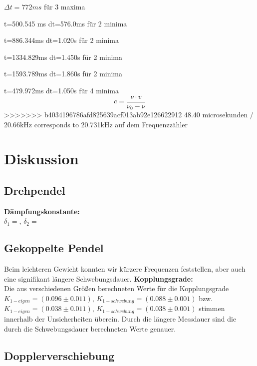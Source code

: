 \documentclass{article}
\begin{document}
$\Delta t=772ms$ für 3 maxima

t=500.545 ms
dt=576.0ms für 2 minima

t=886.344ms
dt=1.020s für 2 minima

t=1334.829ms
dt=1.450s für 2 minima

t=1593.789ms
dt=1.860s für 2 minima

t=479.972ms
dt=1.050s für 4 minima
\begin{equation}
\label{Schallgeschw}
c=\frac{\nu\cdot v}{\nu_{0}-\nu}
\end{equation}
>>>>>>> b4034196786afd825639acf013ab92e126622912
48.40 microsekunden / 20.66kHz corresponds to 20.731kHz auf dem Frequenzzähler

\section{Diskussion}
\subsection*{Drehpendel}
\textbf{Dämpfungskonstante:}\\
$\delta_1=$, $\delta_2=$

\subsection*{Gekoppelte Pendel}
Beim leichteren Gewicht konnten wir kürzere Frequenzen feststellen, aber auch eine signifikant längere Schwebungsdauer.
\textbf{Kopplungsgrade:}\\
Die aus verschiedenen Größen berechneten Werte für die Kopplungsgrade $K_{1-eigen}=(0.096 \pm 0.011)$, $K_{1-schwebung}=(0.088 \pm 0.001)$ bzw. $K_{1-eigen}=(0.038 \pm 0.011)$, $K_{1-schwebung}=(0.038 \pm 0.001)$ stimmen innerhalb der Unsicherheiten überein.
Durch die längere Messdauer sind die durch die Schwebungsdauer berechneten Werte genauer.

\subsection*{Dopplerverschiebung}



\end{document}
